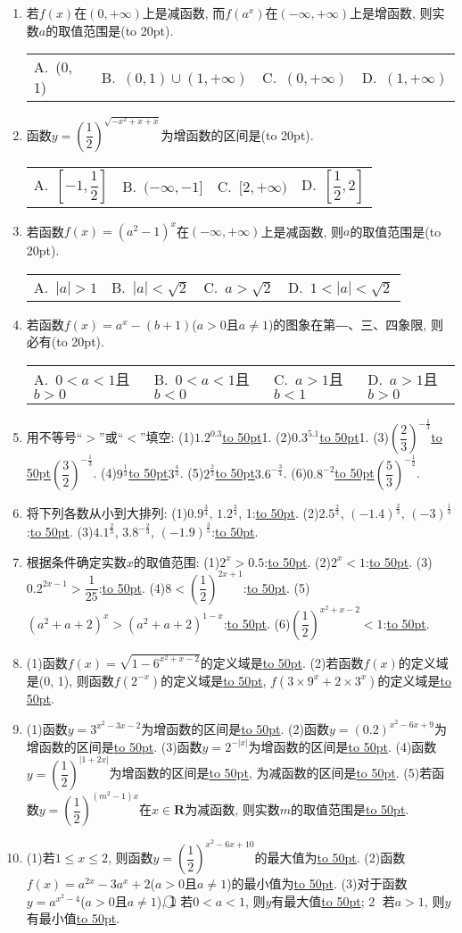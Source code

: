 \documentclass[10pt,a4paper]{article}
\newcommand{\blank}[1]{\underline{\hbox to #1pt{}}}
\newcommand{\bracket}[1]{(\hbox to #1pt{})}
\newcommand{\fourch}[4]{\par\begin{tabular}{p{.23\textwidth}p{.23\textwidth}p{.23\textwidth}p{.23\textwidth}}
A.~#1 &B.~#2& C.~#3& D.~#4
\end{tabular}}
\begin{document}
\begin{enumerate}[1.]
\item 若$f(x)$在$(0,+\infty)$上是减函数, 而$f(a^x)$在$(-\infty ,+\infty)$上是增函数, 则实数$a$的取值范围是\bracket{20}.
\fourch{(0, 1)}{$(0,1)\cup (1,+\infty)$}{$(0,+\infty)$}{$(1,+\infty)$}
\item 函数$y=(\dfrac 12)^{\sqrt {-x^2+x+x}}$为增函数的区间是\bracket{20}.
\fourch{$[-1,\dfrac 12]$}{$(-\infty ,-1]$}{$[2,+\infty)$}{$[\dfrac 12,2]$}
\item 若函数$f(x)=(a^2-1)^x$在$(-\infty ,+\infty)$上是减函数, 则$a$的取值范围是\bracket{20}.
\fourch{$|a|>1$}{$|a|<\sqrt 2$}{$a>\sqrt 2$}{$1<|a|<\sqrt 2$}
\item 若函数$f(x)=a^x-(b+1)$($a>0$且$a\ne 1$)的图象在第―、三、四象限, 则必有\bracket{20}.
\fourch{$0<a<1$且$b>0$}{$0<a<1$且$b<0$}{$a>1$且$b<1$}{$a>1$且$b>0$}
\item 用不等号``$>$''或``$<$''填空:
(1)$1.2^{0.3}$\blank{50}1.			(2)$0.3^{5.1}$\blank{50}1.
(3)$(\dfrac 23)^{-\frac 13}$\blank{50}$(\dfrac 32)^{-\frac 13}$.		(4)$9^{\frac 13}$\blank{50}$3^{\frac 43}$.
(5)$2^{\frac 23}$\blank{50}$3.6^{-\frac 34}$.			(6)$0.8^{-2}$\blank{50}$(\dfrac 53)^{-\frac 12}$.
\item 将下列各数从小到大排列:
(1)$0.9^{\frac 34}$, $1.2^{\frac 34}$, 1:\blank{50}.
(2)$2.5^{\frac 23}$, $(-1.4)^{\frac 23}$, $(-3)^{\frac 13}$:\blank{50}.
(3)$4.1^{\frac 23}$, $3.8^{-\frac 23}$, $(-1.9)^{\frac 35}$:\blank{50}.
\item 根据条件确定实数$x$的取值范围:
(1)$2^x>0.5$:\blank{50}.				(2)$2^x<1$:\blank{50}.
(3)$0.2^{2x-1}>\dfrac 1{25}$:\blank{50}.			(4)$8<(\dfrac 12)^{2x+1}$:\blank{50}.
(5)$(a^2+a+2)^x>(a^2+a+2)^{1-x}$:\blank{50}.
(6)$(\dfrac 12)^{x^2+x-2}<1$:\blank{50}.
\item (1)函数$f(x)=\sqrt {1-6^{x^2+x-2}}$的定义域是\blank{50}.
(2)若函数$f(x)$的定义域是(0, 1), 则函数$f(2^{-x})$的定义域是\blank{50}, $f(3\times 9^x+2\times 3^x)$的定义域是\blank{50}.
\item (1)函数$y=3^{x^2-3x-2}$为增函数的区间是\blank{50}.
(2)函数$y=(0.2)^{x^2-6x+9}$为增函数的区间是\blank{50}.
(3)函数$y=2^{-|x|}$为增函数的区间是\blank{50}.
(4)函数$y=(\dfrac 12)^{|1+2x|}$为增函数的区间是\blank{50}, 为减函数的区间是\blank{50}.
(5)若函数$y=(\dfrac 12)^{(m^2-1)x}$在$x\in \mathbf{R}$为减函数, 则实数$m$的取值范围是\blank{50}.
\item (1)若$1\le x\le 2$, 则函数$y=(\dfrac 12)^{x^2-6x+10}$的最大值为\blank{50}.
(2)函数$f(x)=a^{2x}-3a^x+2$($a>0$且$a\ne 1$)的最小值为\blank{50}.
(3)对于函数$y=a^{x^2-4}$($a>0$且$a\ne 1$), \textcircled{1} 若$0<a<1$, 则$y$有最大值\blank{50}; \textcircled{2} 若$a>1$, 则$y$有最小值\blank{50}.

\end{enumerate}
\end{document}
